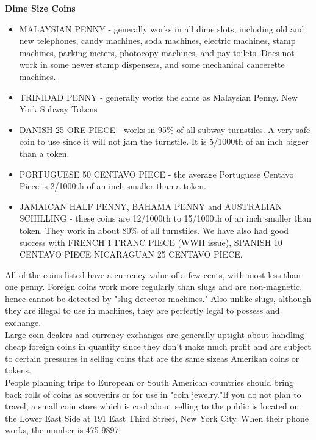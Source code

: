 \documentclass[11pt,twoside,a4paper]{book}
\begin{document}
\textbf{Dime Size Coins} 
\begin{itemize}
	\item MALAYSIAN PENNY         
	- generally works in all dime slots, including old and new telephones, candy machines, 	soda machines, electric machines, stamp machines, parking meters, photocopy machines, and pay toilets. Does not work in some newer stamp dispensers, and some mechanical cancerette machines. 
	\item TRINIDAD PENNY         
	- generally works the same as Malaysian Penny. New York Subway Tokens 
	\item DANISH 25 ORE PIECE         
	- works in 95\% of all subway turnstiles. A very safe coin to use since it will not jam the turnstile. It is 5/1000th of an inch bigger than a token.     
	\item PORTUGUESE 50 CENTAVO PIECE         
	- the average Portuguese Centavo Piece is 2/1000th of an inch smaller than a token.
	\item JAMAICAN HALF PENNY, BAHAMA PENNY and AUSTRALIAN SCHILLING         
	- these coins are 12/1000th to 15/1000th of an inch smaller than token. They work in about 80\% of all turnstiles. We have also had good success with FRENCH 1 FRANC PIECE (WWII issue), SPANISH 10 CENTAVO PIECE NICARAGUAN 25 CENTAVO PIECE.    
\end{itemize}

All of the coins listed have a currency value of a few cents, with most less than one penny. Foreign coins work more regularly than slugs and are non-magnetic, hence cannot be detected by "slug detector machines." Also unlike slugs, although they are illegal to use in machines, they are perfectly legal to possess and exchange.~\\

Large coin dealers and currency exchanges are generally uptight about handling cheap foreign coins in quantity since they don't make much profit and are subject to certain pressures in selling coins that are the same sizeas Amerikan coins or tokens.~\\

People planning trips to European or South American countries should bring back rolls of coins as souvenirs or for use in "coin jewelry."If you do not plan to travel, a small coin store which is cool about selling to the public is located on the Lower East Side at 191 East Third Street, New York City. When their phone works, the number is 475-9897.~\\
\end{document}
